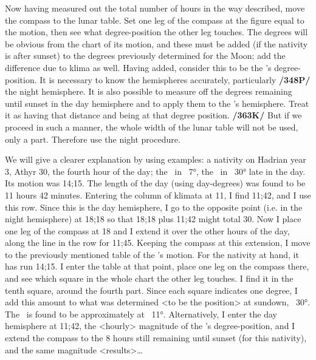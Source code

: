 Now having measured out the total number of hours in the way described, move the compass to the lunar table. Set one leg of the compass at the figure equal to the motion, then see what degree-position the other leg touches. The degrees will be obvious from the chart of its motion, and these must be added (if the nativity is after sunset) to the degrees previously determined for the Moon; add the difference due to klima as well. Having added, consider this to be the \Moon’s degree-position. It is necessary to know the hemispheres accurately, particularly \textbf{/348P/} the night hemisphere. It is also possible to measure off the degrees remaining until sunset in the day hemisphere and to apply them to the \Moon’s hemisphere. Treat it as having that distance and being at that degree position. \textbf{/363K/} But if we proceed in such a manner, the whole width of the lunar table will not be used, only a part. Therefore use the night procedure.

We will give a clearer explanation by using examples: a nativity on Hadrian year 3, Athyr 30, the fourth hour of the day; the \Sun\, in \Scorpio\, 7°, the \Moon\, in \Virgo\, 30° late in the day. Its motion was 14;15. The length of the day (using day-degrees) was found to be 11 hours 42 minutes. Entering the column of klimata at 11, I find 11;42, and I use this row. Since this is the day hemisphere, I go to the opposite point (i.e. in the night hemisphere) at 18;18 so that 18;18 plus 11;42 might total 30. Now I place one leg of the compass at 18 and I extend it over the other hours of the day, along the line in the row for 11;45. Keeping the compass at this extension, I move to the previously mentioned table of the \Moon’s motion. For the nativity at hand, it has run 14;15. I enter the table at that point, place one leg on the compass there, and see which square in the whole chart the other leg touches. I find it in the tenth square, around the fourth part. Since each square indicates one degree, I add this amount to what was determined <to be the position> at sundown, \Virgo\, 30°. The \Moon\, is found to be approximately at \Libra\, 11°. Alternatively, I enter the day hemisphere at 11;42, the <hourly> magnitude of the \Sun’s degree-position, and I extend the compass to the 8 hours still remaining until sunset (for this nativity), and the same magnitude <results>…

\newpage
